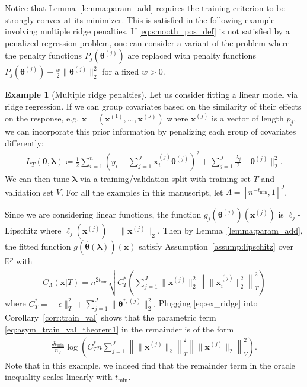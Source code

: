 \documentclass[12pt]{article} %
\theoremstyle{definition}
\newtheorem{example}{Example}
\begin{document}
\noindent Notice that Lemma~\ref{lemma:param_add} requires the training criterion to be strongly convex at its minimizer.
This is satisfied in the following example involving multiple ridge penalties.
If \eqref{eq:smooth_pos_def} is not satisfied by a penalized regression problem, one can consider a variant of the problem where the penalty functions $P_j(\boldsymbol{\theta}^{(j)})$ are replaced with penalty functions
$P_j(\boldsymbol{\theta}^{(j)}) + \frac{w}{2}\| \boldsymbol{\theta}^{(j)} \|_2^2$ for a fixed $w > 0$.
\begin{example}[Multiple ridge penalties]
	Let us consider fitting a linear model via ridge regression.
	If we can group covariates based on the similarity of their effects on the response, e.g. $\boldsymbol{x} = (\boldsymbol{x}^{(1)}, ... , \boldsymbol{x}^{(J)})$ where $\boldsymbol{x}^{(j)}$ is a vector of length $p_j$, we can incorporate this prior information by penalizing each group of covariates differently:
	\begin{align}
	L_T \left (\boldsymbol{\theta}, \boldsymbol{\lambda} \right) 
	\coloneqq 
	\frac{1}{2}
	\sum_{i=1}^n
	\left(y_i -  \sum_{j=1}^J \boldsymbol{x}_{i}^{(j)} \boldsymbol{\theta}^{(j)} \right )^2
	+ \sum_{j=1}^J \frac{\lambda_j}{2} \|\boldsymbol{\theta}^{(j)}\|_2^2.
	\end{align}
	We can then tune $\boldsymbol{\lambda}$ via a training/validation split with training set $T$ and validation set $V$.
	For all the examples in this manuscript, let $\Lambda = \left [n^{- t_{\min}}, 1 \right ]^J$.

	Since we are considering linear functions, the function $g_j(\boldsymbol{\theta}^{(j)})(\boldsymbol{x}^{(j)})$ is $\ell_j$-Lipschitz where $\ell_j(\boldsymbol{x}^{(j)}) = \|\boldsymbol{x}^{(j)}\|_2$.
	Then by Lemma~\ref{lemma:param_add}, the fitted function $g(\hat{\boldsymbol{\theta}}(\boldsymbol{\lambda}))(\boldsymbol{x})$ satisfy Assumption~\ref{assump:lipschitz} over $\mathbb{R}^p$ with
	\begin{align}
	C_\Lambda \left ( \boldsymbol{x} | T \right ) =
	n^{2t_{\min}}
	\sqrt{
		C^*_{T}
		\left(
		\sum_{j = 1}^J
		\|\boldsymbol{x}^{(j)}\|_2^2
		\left \| \|\boldsymbol{x}^{(j)}_i \|_2^2 \right \|_T^2
		\right)
	}
	\label{eq:ex_ridge}
	\end{align}
	where $
	C^*_{T} = 
	\|\epsilon\|_{T}^{2}
	+ \sum_{j=1}^J \|\boldsymbol{\theta}^{*,(j)}\|_2^2
	.$
	Plugging \eqref{eq:ex_ridge} into Corollary~\ref{corr:train_val} shows that the parametric term \eqref{eq:asym_train_val_theorem1} in the remainder is of the form
	\begin{align}
	\frac{J t_{\min}}{n_{V}}
	\log \left (
	C^*_T n
	\sum_{j = 1}^J \left \|\|\boldsymbol{x}^{(j)} \|_2 \right \|_T^2 \left \|\|\boldsymbol{x}^{(j)}\|_2 \right \|_V^2
	\right ).
	\end{align}
	Note that in this example, we indeed find that the remainder term in the oracle inequality scales linearly with $t_{\min}$.
\end{example}
\end{document}
